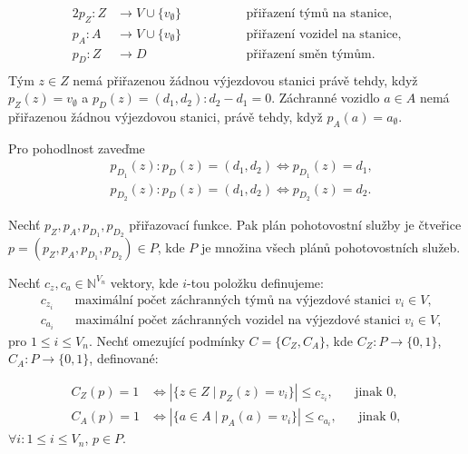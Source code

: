 \begin{definice}
  \begin{alignat*}{2}
    p_Z \colon Z &\rightarrow V \cup \{ v_{\emptyset} \} \quad && \hspace{30pt} \text{přiřazení týmů na stanice}, \\
    p_A \colon A &\rightarrow V \cup \{ v_{\emptyset} \} \quad && \hspace{30pt} \text{přiřazení vozidel na stanice}, \\ 
    p_{D} \colon Z &\rightarrow D                        \quad && \hspace{30pt} \text{přiřazení směn týmům}. \\
  \end{alignat*}
  Tým $z \in Z$ nemá přiřazenou žádnou výjezdovou stanici právě tehdy, když
  $p_{Z}(z) = v_{\emptyset}$ a $p_{D}(z) = (d_1, d_2) \colon d_2 - d_1 = 0$.
  Záchranné vozidlo $a \in A$ nemá přiřazenou žádnou výjezdovou stanici, právě tehdy, když $p_{A}(a) = a_{\emptyset}$.

  Pro pohodlnost zaveďme 
  \begin{align*}
    & p_{D_1}(z) \colon p_D(z) = (d_1, d_2) \Leftrightarrow p_{D_1}(z) = d_1, \\
    & p_{D_2}(z) \colon  p_D(z) = (d_1, d_2) \Leftrightarrow p_{D_2}(z) = d_2.
  \end{align*}
\end{definice}

\begin{definice}
  Nechť $p_Z, p_A, p_{D_{1}}, p_{D_{2}}$ přiřazovací funkce.
  Pak plán pohotovostní služby je čtveřice $p = (p_Z, p_A, p_{D_{1}}, p_{D_{2}}) \in P$, kde $P$ je množina všech plánů pohotovostních služeb.
\end{definice}

\begin{definice}
  Nechť $c_z, c_a \in \mathbb{N}^{V_n}$ vektory, 
  kde $i$-tou položku definujeme:
  \begin{align*}
    &c_{z_{i}} \hspace{20pt} \text{maximální počet záchranných týmů na výjezdové stanici $v_i \in V$}, \\ 
    &c_{a_{i}} \hspace{20pt} \text{maximální počet záchranných vozidel na výjezdové stanici $v_i \in V$},
  \end{align*}
  pro $1 \leq i \leq V_n$.
  Nechť omezující podmínky $C = \{ C_Z, C_A \}$, kde $C_Z \colon P \rightarrow \{ 0, 1 \}$, $C_A \colon P \rightarrow \{ 0, 1 \}$, definované:

  \begin{align*}
    C_Z(p) = 1 &\iff |\{ z \in Z \mid p_Z(z) = v_i \}| \leq c_{z_{i}}, \hspace{20pt} \text{jinak 0}, \\
    C_A(p) = 1 &\iff |\{ a \in A \mid p_A(a) = v_i \}| \leq c_{a_{i}}, \hspace{20pt} \text{jinak 0},
  \end{align*}
  $\forall i \colon 1 \leq i \leq V_n$, $p \in P$.
\end{definice}

